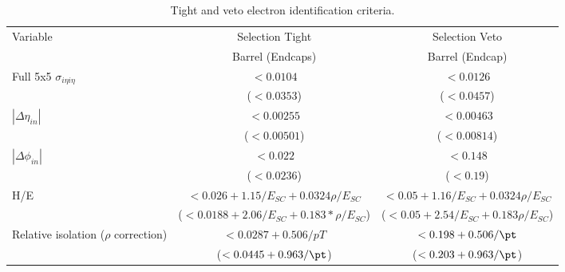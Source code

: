 \begin{table}[htb]
    \centering
    \small
    \def\arraystretch{1.5}
    \caption{Tight and veto electron identification criteria.}

    \begin{tabular}{ l c c}
        \hline\hline
        Variable                                                & Selection Tight                              & Selection Veto                             \\
                                                                & Barrel (Endcaps)                             & Barrel (Endcap)                            \\
        \hline
        \hline
        \multirow{2}{*}{Full 5x5 $\sigma_{i\eta i\eta}$}        & $< 0.0104  $                                 & $< 0.0126   $                              \\
                                                                & ($< 0.0353   $)                              & ($< 0.0457   $)                            \\\cline{2-3}
        \multirow{2}{*}{$|\Delta \eta_{in}|$}                   & $< 0.00255  $                                & $< 0.00463  $                              \\
                                                                & ($< 0.00501  $)                              & ($< 0.00814   $)                           \\\cline{2-3}
        \multirow{2}{*}{$|\Delta \phi_{in}|$}                   & $< 0.022   $                                 & $< 0.148    $                              \\
                                                                & ($< 0.0236   $)                              & ($< 0.19    $)                             \\\cline{2-3}
        \multirow{2}{*}{H/E}                                    & $< 0.026+1.15/E_{SC}+0.0324\rho/E_{SC}  $    & $< 0.05+1.16/E_{SC}+0.0324\rho/E_{SC}   $  \\
                                                                & ($< 0.0188+2.06/E_{SC}+0.183*\rho/E_{SC}  $) & ($< 0.05+2.54/E_{SC}+0.183\rho/E_{SC}   $) \\\cline{2-3}
        \multirow{2}{*}{Relative isolation ($\rho$ correction)} & $< 0.0287+0.506/pT  $                        & $< 0.198+0.506/\pt   $                     \\
                                                                & ($< 0.0445+0.963/\pt  $)                     & ($< 0.203+0.963/\pt   $)                   \\\cline{2-3}

\end{tabular}
\end{table}
